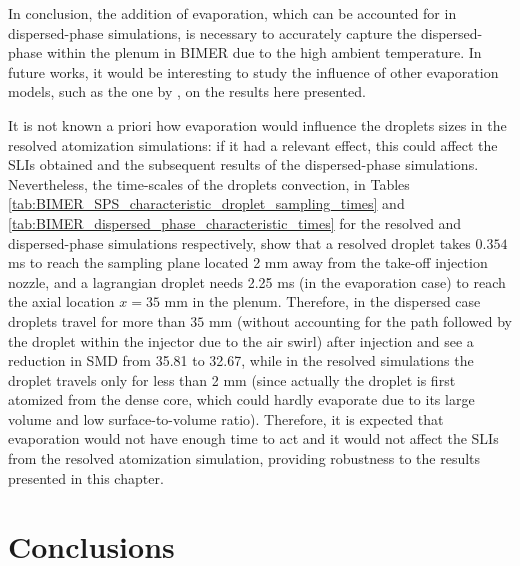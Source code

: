 In conclusion, the addition of evaporation, which can be accounted for in dispersed-phase simulations, is necessary to accurately capture the dispersed-phase within the plenum in BIMER due to the high ambient temperature. In future works, it would be interesting to study the influence of other evaporation models, such as the one by , on the results here presented. 

It is not known a priori how evaporation would influence the droplets sizes in the resolved atomization simulations: if it had a relevant effect, this could affect the SLIs obtained and the subsequent results of the dispersed-phase simulations. Nevertheless, the time-scales of the droplets convection, in Tables \ref{tab:BIMER_SPS_characteristic_droplet_sampling_times} and \ref{tab:BIMER_dispersed_phase_characteristic_times} for the resolved and dispersed-phase simulations respectively, show that a resolved droplet takes $0.354$ ms to reach the sampling plane located 2 mm  away from the take-off injection nozzle, and a lagrangian droplet needs 2.25 ms (in the evaporation case) to reach the axial location $x = 35$ mm in the plenum. Therefore, in the dispersed case droplets travel for more than $35$ mm (without accounting for the path followed by the droplet within the injector due to the air swirl) after injection and see a reduction in SMD from 35.81 to 32.67, while in the resolved simulations the droplet travels only for less than 2 mm (since actually the droplet is first atomized from the dense core, which could hardly evaporate due to its large volume and low surface-to-volume ratio). Therefore, it is expected that evaporation would not have enough time to act and it would not affect the SLIs from the resolved atomization simulation, providing robustness to the results presented in this chapter.

%


\section{Conclusions}


